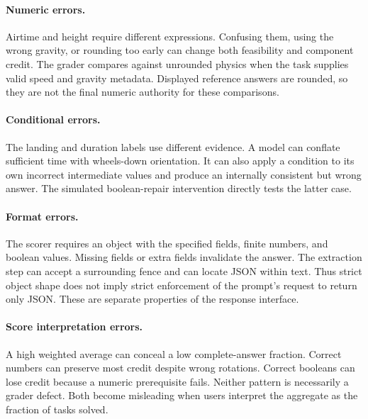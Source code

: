 \documentclass{article}
\begin{document}
\paragraph{Numeric errors.} Airtime and height require different expressions. Confusing them, using the wrong gravity, or rounding too early can change both feasibility and component credit. The grader compares against unrounded physics when the task supplies valid speed and gravity metadata. Displayed reference answers are rounded, so they are not the final numeric authority for these comparisons.
\paragraph{Conditional errors.} The landing and duration labels use different evidence. A model can conflate sufficient time with wheels-down orientation. It can also apply a condition to its own incorrect intermediate values and produce an internally consistent but wrong answer. The simulated boolean-repair intervention directly tests the latter case.
\paragraph{Format errors.} The scorer requires an object with the specified fields, finite numbers, and boolean values. Missing fields or extra fields invalidate the answer. The extraction step can accept a surrounding fence and can locate JSON within text. Thus strict object shape does not imply strict enforcement of the prompt's request to return only JSON. These are separate properties of the response interface.
\paragraph{Score interpretation errors.} A high weighted average can conceal a low complete-answer fraction. Correct numbers can preserve most credit despite wrong rotations. Correct booleans can lose credit because a numeric prerequisite fails. Neither pattern is necessarily a grader defect. Both become misleading when users interpret the aggregate as the fraction of tasks solved.
\end{document}
